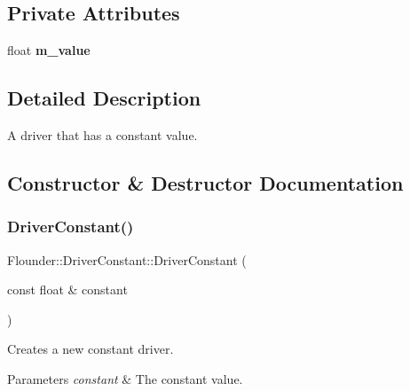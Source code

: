 \subsection*{Private Attributes}
\begin{DoxyCompactItemize}
\item 
\mbox{\label{class_flounder_1_1_driver_constant_a151c7d23fcb384fae9b03b23fc2ab265}} 
float {\bfseries m\+\_\+value}
\end{DoxyCompactItemize}


\subsection{Detailed Description}
A driver that has a constant value. 



\subsection{Constructor \& Destructor Documentation}
\mbox{\label{class_flounder_1_1_driver_constant_a591cd1e7c9ec47a37b7007aff42d6ff7}} 
\subsubsection{\texorpdfstring{Driver\+Constant()}{DriverConstant()}}
{\footnotesize\ttfamily Flounder\+::\+Driver\+Constant\+::\+Driver\+Constant (\begin{DoxyParamCaption}\item[{const float \&}]{constant }\end{DoxyParamCaption})}



Creates a new constant driver. 


\begin{DoxyParams}{Parameters}
{\em constant} & The constant value. \\
\hline
\end{DoxyParams}
\mbox{\label{class_flounder_1_1_driver_constant_a7e4f905297655e36b7d7d6ba946f3fad}} 
